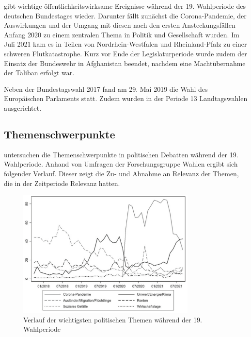 \textcite{schmid_deutscher_2021} gibt wichtige öffentlichkeitswirksame Ereignisse während der \num{19}. Wahlperiode des deutschen Bundestages wieder. Darunter fällt zunächst die Corona-Pandemie, der Auswirkungen und der Umgang mit diesen nach den ersten Ansteckungsfällen Anfang 2020 zu einem zentralen Thema in Politik und Gesellschaft wurden. Im Juli 2021 kam es in Teilen von Nordrhein-Westfalen und Rheinland-Pfalz zu einer schweren Flutkatastrophe. Kurz vor Ende der Legislaturperiode wurde zudem der Einsatz der Bundeswehr in Afghanistan beendet, nachdem eine Machtübernahme der Taliban erfolgt war.

Neben der Bundestagswahl \num{2017} fand am 29. Mai 2019 die Wahl des Europäischen Parlaments statt. Zudem wurden in der Periode \num{13} Landtagswahlen ausgerichtet.

\subsection{Themenschwerpunkte} \label{subsec:themenschwerpunkte}

\textcite{engler_wettbewerb_2022} untersuchen die Themenschwerpunkte in politischen Debatten während der \num{19}. Wahlperiode. Anhand von Umfragen der Forschungsgruppe Wahlen ergibt sich folgender Verlauf. Dieser zeigt die Zu- und Abnahme an Relevanz der Themen, die in der Zeitperiode Relevanz hatten.

\begin{figure}[H]
    \centering
    \includegraphics[width=0.8\textwidth]{data/images/themenkonjunktur.png}
    \caption{Verlauf der wichtigsten politischen Themen während der 19. Wahlperiode \autocite{engler_wettbewerb_2022, forschungsgruppe_wahlen_forschungsgruppe_nodate}} \label{fig:themenkonjunktur}
\end{figure}

